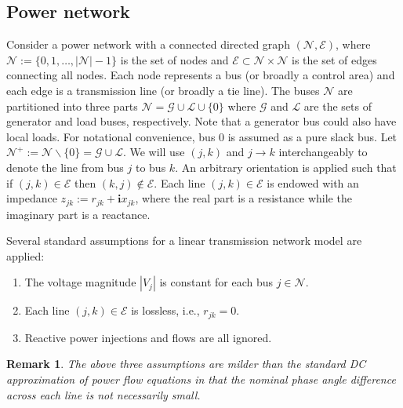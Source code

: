\documentclass[journal,12pt,onecolumn,draftclsnofoot]{IEEEtran}
\newtheorem{remark}{Remark}
\begin{document}
\subsection{Power network}

Consider a power network with a connected directed graph $(\mathcal{N},\mathcal{E})$, where $\mathcal{N}:=\{0,1,\dots,|\mathcal{N}|-1\}$ is the set of nodes and $\mathcal{E}\subset\mathcal{N}\times\mathcal{N}$ is the set of edges connecting all nodes. Each node represents a bus (or broadly a control area) and each edge is a transmission line (or broadly a tie line). The buses $\mathcal{N}$ are partitioned into three parts $\mathcal{N}=\mathcal{G}\cup\mathcal{L}\cup\{0\}$ where $\mathcal{G}$ and $\mathcal{L}$ are the sets of generator and load buses, respectively. Note that a generator bus could also have local loads. For notational convenience, bus 0 is assumed as a pure slack bus. Let $\mathcal{N}^+:=\mathcal{N}\backslash \{0\}=\mathcal{G}\cup\mathcal{L}$.
We will use $(j,k)$ and $j\rightarrow k$ interchangeably to denote the line from bus $j$ to bus $k$. An arbitrary orientation is applied such that if $(j,k)\in\mathcal{E}$ then $(k,j)\notin\mathcal{E}$. Each line $(j,k)\in\mathcal{E}$ is endowed with an impedance $z_{jk}:=r_{jk}+ \mathrm{\textbf{i}} x_{jk}$, where the real part is a resistance while the imaginary part is a reactance. 

Several standard assumptions for a linear transmission network model are applied:
\begin{enumerate}
	\item The voltage magnitude $|V_j|$ is constant for each bus $j\in\mathcal{N}$.
	\item Each line $(j,k)\in\mathcal{E}$ is lossless, i.e., $r_{jk}=0$.
	\item Reactive power injections and flows are all ignored.
\end{enumerate}
\begin{remark}
	The above three assumptions are milder than the standard DC approximation of power flow equations in that the nominal phase angle difference across each line is not necessarily small.  
\end{remark}
\end{document}

